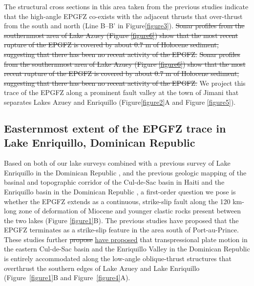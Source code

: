 \documentclass[linenumbers,draft]{agujournal}
\providecommand{\DIFadd}[1]{{\protect\color{blue}\uwave{#1}}} %
\providecommand{\DIFdel}[1]{{\protect\color{red}\sout{#1}}}                      %
\providecommand{\DIFaddbegin}{} %
\providecommand{\DIFaddend}{} %
\providecommand{\DIFdelbegin}{} %
\providecommand{\DIFdelend}{} %
\begin{document}
The structural cross sections in this area taken from the previous studies \citep{massoni1955haiti,mann1995actively,douilly2015three} indicate that the high-angle EPGFZ co-exists with the adjacent thrusts that over-thrust from the south and north (Line B--B' in Figure\DIFaddbegin \DIFadd{~}\DIFaddend \ref{figure3}). \DIFdelbegin \DIFdel{Sonar profiles from the southernmost area of Lake Azuey (Figure \ref{figure6}) show that the most recent rupture of the EPGFZ is covered by about 0.7 m of Holocene sediment, suggesting that there has been no recent activity of the EPGFZ. }\DIFdelend \DIFaddbegin \st{Sonar profiles from the southernmost area of Lake Azuey (Figure {\ref{figure6}}) show that the most recent rupture of the EPGFZ is covered by about 0.7 m of Holocene sediment, suggesting that there has been no recent activity of the EPGFZ.} \DIFaddend We project this trace of the EPGFZ along a prominent fault valley at the town of Jimani that separates Lakes Azuey and Enriquillo (Figure\DIFaddbegin \DIFadd{~}\DIFaddend \ref{figure2}A and Figure \ref{figure5}).

\subsection{Easternmost extent of the EPGFZ trace in Lake Enriquillo, Dominican Republic}
Based on both of our lake surveys combined with a previous survey of Lake Enriquillo in the Dominican Republic \citep{rios2013holocene}, and the previous geologic mapping of the basinal and topographic corridor of the Cul-de-Sac basin in Haiti and the Enriquillo basin in the Dominican Republic \citep{mann1995actively,mann1999caribbean}, a first-order question we pose is whether the EPGFZ extends as a continuous, strike-slip fault along the 120 km-long zone of deformation of Miocene and younger clastic rocks present between the two lakes (Figure \ref{figure1}B). The previous studies \citep{saint2015seismotectonics,symithe2016present} have proposed that the EPGFZ terminates as a strike-slip feature in the area south of Port-au-Prince. These studies further \DIFdelbegin \DIFdel{propose }\DIFdelend \DIFaddbegin \ul{have proposed} \DIFaddend that transpressional plate motion in the eastern Cul-de-Sac basin and the Enriquillo Valley in the Dominican Republic is entirely accommodated along the low-angle oblique-thrust structures that overthrust the southern edges of Lake Azuey and Lake Enriquillo (Figure~\ref{figure1}B and Figure~\ref{figure4}A). 
\end{document}
